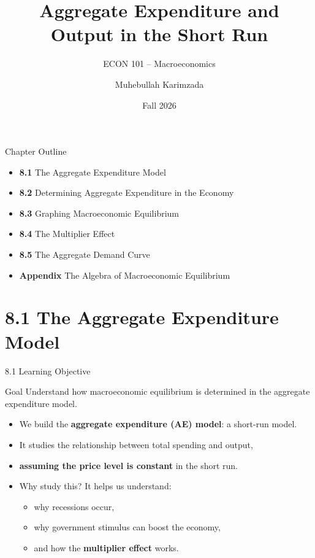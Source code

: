 \documentclass[aspectratio=169]{beamer}
\title{\textbf{Aggregate Expenditure and Output in the Short Run}}
\subtitle{{\large ECON 101 -- Macroeconomics}}
\author{Muhebullah Karimzada}
\date{Fall 2026}
\begin{document}

\begin{frame}[plain]
  \titlepage
\end{frame}

\begin{frame}{Chapter Outline}
\transfade
\begin{itemize}
  \item \textbf{8.1} The Aggregate Expenditure Model
  \item \textbf{8.2} Determining Aggregate Expenditure in the Economy
  \item \textbf{8.3} Graphing Macroeconomic Equilibrium
  \item \textbf{8.4} The Multiplier Effect
  \item \textbf{8.5} The Aggregate Demand Curve
  \item \textbf{Appendix} The Algebra of Macroeconomic Equilibrium
\end{itemize}
\end{frame}

\section{8.1 The Aggregate Expenditure Model}

\begin{frame}{8.1 Learning Objective}
\transfade
\begin{block}{Goal}
Understand how macroeconomic equilibrium is determined in the aggregate expenditure model.
\end{block}
\begin{itemize}
  \item We build the \textbf{aggregate expenditure (AE) model}: a short-run model.
  \item It studies the relationship between total spending and output,
  \item \textbf{assuming the price level is constant} in the short run.
  \item Why study this? It helps us understand:
  \begin{itemize}
    \item why recessions occur,
    \item why government stimulus can boost the economy,
    \item and how the \textbf{multiplier effect} works.
  \end{itemize}
\end{itemize}
\end{frame}
\end{document}
